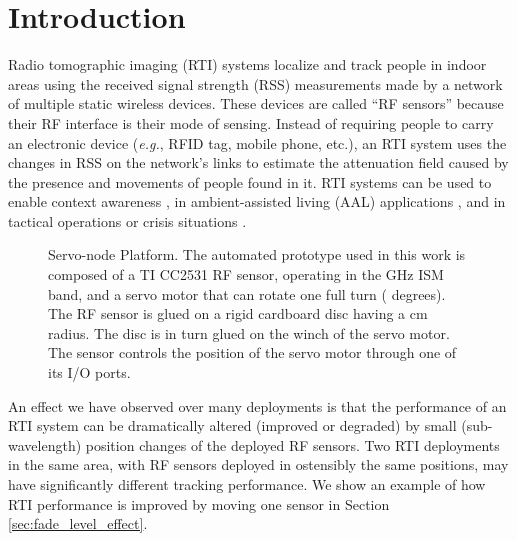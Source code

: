 \documentclass[conference]{IEEEtran}
\begin{document}
\IEEEpeerreviewmaketitle









\section{Introduction}
\label{sec:introduction}

Radio tomographic imaging (RTI) systems \cite{Wilson_RTI_2010,Patwari_2010_IEEE} localize and track people in indoor areas using the received signal strength (RSS) measurements made by a network of multiple static wireless devices.  These devices are called ``RF sensors'' because their RF interface is their mode of sensing. Instead of requiring people to carry an electronic device (\emph{e.g.}, RFID tag, mobile phone, etc.), an RTI system uses the changes in RSS on the network's links to estimate the attenuation field caused by the presence and movements of people found in it. RTI systems can be used to enable context awareness \cite{Grandma_2012,Xu_2013,MTT_2013,Nannuru_2013}, in ambient-assisted living (AAL) applications \cite{EvAAL_book,falling_detection}, and in tactical operations or crisis situations \cite{Timonen_RTI,Joint_UWB_RSS}.

\begin{figure}[t]
    \begin{center}
        \caption{Servo-node Platform. The automated prototype used in this work is composed of a TI CC2531 RF sensor, operating in the  GHz ISM band, and a servo motor that can rotate one full turn ( degrees). The RF sensor is glued on a rigid cardboard disc having a  cm radius. The disc is in turn glued on the winch of the servo motor. The sensor controls the position of the servo motor through one of its I/O ports.}
        \label{fig:servo_node}
    \end{center}
\end{figure}

An effect we have observed over many deployments is that the performance of an RTI system can be dramatically altered (improved or degraded) by small (sub-wavelength) position changes of the deployed RF sensors.  Two RTI deployments in the same area, with RF sensors deployed in ostensibly the same positions, may have significantly different tracking performance.  We show an example of how RTI performance is improved by moving one sensor in Section \ref{sec:fade_level_effect}.
\end{document}
